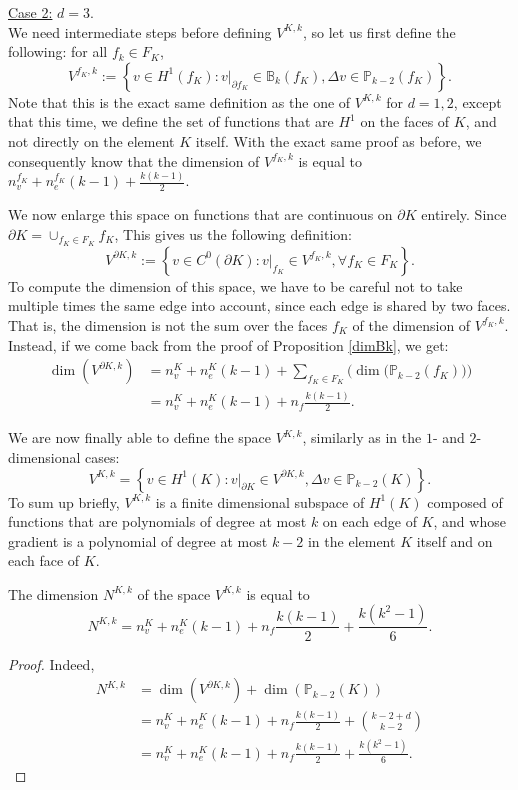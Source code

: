 \noindent \underline{Case 2:} $d=3$. \\
\noindent We need intermediate steps before defining $V^{K,k}$, so let us first define the following: for all $f_k\in F_K$, 
$$V^{f_K,k} := \left\{v\in H^1(f_K) : v|_{\partial f_K} \in \mathbb{B}_k(f_K), \Delta v\in \mathbb{P}_{k-2}(f_K)\right\}.$$
Note that this is the exact same definition as the one of $V^{K,k}$ for $d=1,2$, except that this time, we define the set of functions that are $H^1$ on the faces of $K$, and not directly on the element $K$ itself. With the exact same proof as before, we consequently know that the dimension of $V^{f_K,k}$ is equal to $n_v^{f_K} + n_e^{f_K}(k-1) + \frac{k(k-1)}{2}$. 

We now enlarge this space on functions that are continuous on $\partial K$ entirely. Since $\partial K = \cup_{f_K\in F_K}f_K$, This gives us the following definition:
$$V^{\partial K,k} := \left\{v\in C^0(\partial K) : v|_{f_K}\in V^{f_K,k}, \forall f_K\in F_K\right\}.$$
To compute the dimension of this space, we have to be careful not to take multiple times the same edge into account, since each edge is shared by two faces. That is, the dimension is not the sum over the faces $f_K$ of the dimension of $V^{f_K,k}$. Instead, if we come back from the proof of Proposition \ref{dimBk}, we get:
\begin{align*}
\dim\left(V^{\partial K, k}\right) &= n_v^K + n_e^K(k-1) + \sum_{f_K\in F_K}\Big(\dim\big(\mathbb{P}_{k-2} \left(f_K\right)\big)\Big)\\
&= n_v^K + n_e^K(k-1) + n_f\frac{k(k-1)}{2}.
\end{align*}

We are now finally able to define the space $V^{K,k}$, similarly as in the $1$- and $2$-dimensional cases:
$$V^{K,k} = \left\{v\in H^1(K):v|_{\partial K}\in V^{\partial K,k}, \Delta v\in \mathbb{P}_{k-2}(K)\right\}.$$
To sum up briefly, $V^{K,k}$ is a finite dimensional subspace of $H^1(K)$ composed of functions that are polynomials of degree at most $k$ on each edge of $K$, and whose gradient is a polynomial of degree at most $k-2$ in the element $K$ itself and on each face of $K$. 

\begin{proposition}
The dimension $N^{K,k}$ of the space $V^{K,k}$ is equal to $$N^{K,k} = n_v^K + n_e^K(k-1) + n_f\frac{k(k-1)}{2} + \frac{k(k^2-1)}{6}.$$
\end{proposition}
\begin{proof}
Indeed, 
\begin{align*}
N^{K,k} &= \dim\left(V^{\partial K,k}\right) +  \dim\left(\mathbb{P}_{k-2}(K)\right)\\
&= n_v^K + n_e^K(k-1) + n_f\frac{k(k-1)}{2} + \binom{k-2+d}{k-2} \\
&= n_v^K + n_e^K(k-1) + n_f\frac{k(k-1)}{2} + \frac{k(k^2-1)}{6}.
\end{align*}
\end{proof}


